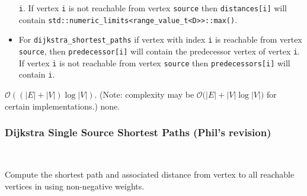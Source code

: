 \begin{itemdescr}
\begin{itemize}
                  \lstinline{i}.  If vertex \lstinline{i} is not reachable from vertex
                  \lstinline{source} then \lstinline{distances[i]} will contain
                  \lstinline{std::numeric_limits<range_value_t<D>>::max()}.
            \item
                  For \lstinline{dijkstra_shortest_paths} if vertex with index \lstinline{i} is reachable
                  from vertex \lstinline{source}, then \lstinline{predecessor[i]} will contain the
                  predecessor vertex of vertex \lstinline{i}.  If vertex \lstinline{i} is not reachable
                  from vertex \lstinline{source} then \lstinline{predecessors[i]} will contain
                  \lstinline{i}.
      \end{itemize}
      \pnum\complexity $\mathcal{O}((|E| + |V|)\log{|V|})$.  (Note: complexity may be
            $\mathcal{O}(|E| + |V|\log{|V|)}$ for certain implementations.)
      \pnum\throws none. 
\end{itemdescr}

\subsubsection{Dijkstra Single Source Shortest Paths (Phil's revision)}

 \\

Compute the shortest path and associated distance from vertex  to all reachable vertices in 
using non-negative weights.

